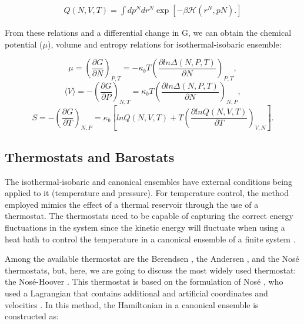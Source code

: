 \begin{equation}
\begin{aligned}
Q(N,V,T) = \int dp^{N} dr^{N} \exp \left[ -\beta \mathcal{H} (r^{N},p{N}) .
\right]
\end{aligned}
\end{equation}

From these relations and a differential change in G, we can obtain the chemical potential ($\mu$), volume and entropy relations for isothermal-isobaric ensemble:

\begin{equation}
\mu = \left (\frac{\partial G}{\partial N} \right)_{P,T} = - \kappa_{b} T \left(\frac{\partial ln \Delta (N,P,T)}{\partial N} \right)_{P,T},
\end{equation}  
\begin{equation}
\langle V \rangle= - \left (\frac{\partial G}{\partial P} \right)_{N,T}= \kappa_{b} T \left (\frac{\partial ln \Delta (N,P,T)}{\partial N} \right)_{N,P},
\end{equation}
\begin{equation}
S =  - \left (\frac{\partial G}{\partial T} \right)_{N,P}= \kappa_{b}  \left[ln Q(N,V,T)+ T \left (\frac{\partial ln Q (N,V,T)}{\partial T} \right)_{V,N}\right] .
\end{equation}

\subsection{Thermostats and Barostats}

The isothermal-isobaric and canonical ensembles have external conditions being applied to it (temperature and pressure). For temperature control, the method employed mimics the effect of a thermal reservoir through the use of a thermostat. The thermostats need to be capable of capturing the correct energy fluctuations in the system since the kinetic energy will fluctuate when using a heat bath to control the temperature in a canonical ensemble of a finite system \cite{frenkel}.  

Among the available thermostat are the Berendsen \cite{doi:10.1063/1.448118}, the Andersen \cite{1980JChPh722384A}, and the Nos\'{e} \cite{1984JChPh81511N} thermostats, but, here, we are going to discuss the most widely used thermostat: the Nosé-Hoover \cite{PhysRevA.31.1695}. This thermostat is based on the formulation of Nosé \cite{1984JChPh81511N}, who used a Lagrangian that contains additional and artificial coordinates and velocities \cite{frenkel}. In this method, the Hamiltonian in a canonical ensemble is constructed as:

